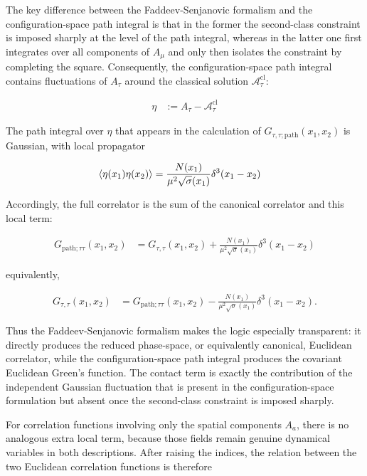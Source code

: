 The key difference between the Faddeev-Senjanovic formalism and the configuration-space path integral is that in the former the second-class constraint is imposed sharply at the level of the path integral, whereas in the latter one first integrates over all components of $A_{\mu}$ and only then isolates the constraint by completing the square. Consequently, the configuration-space path integral contains fluctuations of $A_{\tau}$ around the classical solution $\mathcal{A}_{\tau}^{\mathrm{cl}}$:

\begin{align}
\eta & :=A_{\tau}-\mathcal{A}_{\tau}^{\mathrm{cl}}
\end{align}

The path integral over $\eta$ that appears in the calculation of $\displaystyle{G_{\tau,\tau;\text{path}}(x_{1},x_{2})}$ is Gaussian, with local propagator

\begin{align}
\left\langle \eta(x_{1})\eta(x_{2}) \right\rangle & =\frac{N(x_{1})}{\mu ^{2}\sqrt{ \sigma }(x_{1})}\delta ^{3}(x_{1}-x_{2})
\end{align}

Accordingly, the full correlator is the sum of the canonical correlator and this local term:

\begin{align}
G_{\mathrm{path};\tau \tau}(x_{1},x_{2}) & =G_{\tau,\tau}(x_{1},x_{2})+\frac{N(x_{1})}{\mu ^{2}\sqrt{ \sigma }(x_{1})}\delta ^{3}(x_{1}-x_{2})
\end{align}

equivalently,

\begin{align}
G_{\tau,\tau}(x_{1},x_{2}) & =G_{\mathrm{path};\tau \tau}(x_{1},x_{2})-\frac{N(x_{1})}{\mu ^{2}\sqrt{ \sigma }(x_{1})}\delta ^{3}(x_{1}-x_{2}).
\end{align}

Thus the Faddeev-Senjanovic formalism makes the logic especially transparent: it directly produces the reduced phase-space, or equivalently canonical, Euclidean correlator, while the configuration-space path integral produces the covariant Euclidean Green's function. The contact term is exactly the contribution of the independent Gaussian fluctuation that is present in the configuration-space formulation but absent once the second-class constraint is imposed sharply.

For correlation functions involving only the spatial components $A_{a}$, there is no analogous extra local term, because those fields remain genuine dynamical variables in both descriptions. After raising the indices, the relation between the two Euclidean correlation functions is therefore

